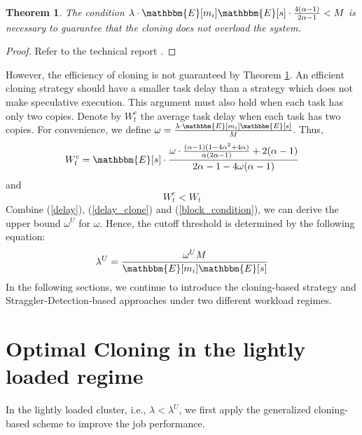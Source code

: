 \documentclass[10pt,conference]{IEEEtran}
\newtheorem{Theorem}{Theorem}
\begin{document}
\begin{Theorem}
The condition $\lambda \cdot \mathbbm{E}[m_i] \mathbbm{E}[s] \cdot \frac{4(\alpha-1)}{2\alpha - 1} < M$ is necessary to guarantee that the cloning does not overload the system.
\label{threshold}
\end{Theorem}
\begin{proof}
Refer to the technical report \cite{speculative-multi-job}.
\end{proof}
However, the efficiency of cloning is not guaranteed by Theorem \ref{threshold}. An efficient cloning strategy should have a smaller task delay than a strategy which does not make speculative execution. This argument must also hold when each task has only two copies. Denote by $W_t^c$ the average task delay when each task has two copies. For convenience, we define $\omega = \frac{\lambda \cdot \mathbbm{E}[m_i] \mathbbm{E}[s]}{M}$. Thus,
\begin{equation}
W_t^c = \mathbbm{E}[s]\cdot \frac{\omega \cdot \frac{(\alpha - 1)(1-4\alpha^2+4\alpha)}{\alpha(2\alpha - 1)} + 2(\alpha - 1)}{2\alpha - 1 - 4\omega (\alpha - 1)}
\label{delay_clone}
\end{equation}
and
\begin{equation}
W_t^c < W_t
\label{block_condition}
\end{equation}
Combine (\ref{delay}), (\ref{delay_clone}) and (\ref{block_condition}), we can derive the upper bound
$\omega^U$  for $\omega$. Hence, the cutoff threshold is determined by the following equation:
\begin{equation}
\lambda^U = \frac{\omega^U M}{\mathbbm{E}[m_i] \mathbbm{E}[s]}
\end{equation}
In the following sections, we continue to introduce the cloning-based strategy and Straggler-Detection-based approaches under two different workload regimes. $~$


\section{Optimal Cloning in the lightly loaded regime}
\label{SCA_design}
In the lightly loaded cluster, i.e., $\lambda < \lambda^U$, we first apply the generalized cloning-based scheme to improve the job performance.
\end{document}
